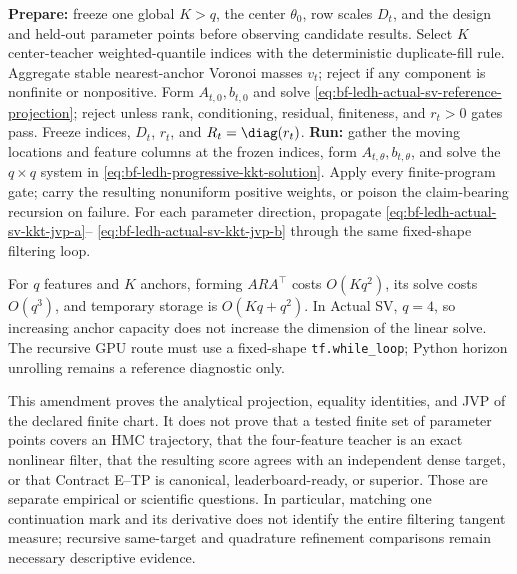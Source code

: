 \begin{algorithm}[H]
\caption{Actual-SV overcomplete analytical chart preparation and runtime}
\label{alg:bf-ledh-actual-sv-overcomplete-chart}
\begin{algorithmic}[1]
  \State \textbf{Prepare:} freeze one global \(K>q\), the center
    \(\theta_0\), row scales \(D_t\), and the design and held-out parameter
    points before observing candidate results.
    \State Select \(K\) center-teacher weighted-quantile indices with the
      deterministic duplicate-fill rule.
    \State Aggregate stable nearest-anchor Voronoi masses \(v_t\); reject if
      any component is nonfinite or nonpositive.
    \State Form \(A_{t,0},b_{t,0}\) and solve
      \eqref{eq:bf-ledh-actual-sv-reference-projection}; reject unless rank,
      conditioning, residual, finiteness, and \(r_t>0\) gates pass.
    \State Freeze indices, \(D_t\), \(r_t\), and \(R_t=\diag(r_t)\).
  \EndFor
  \State \textbf{Run:} gather the moving locations and feature columns at the
    frozen indices, form \(A_{t,\theta},b_{t,\theta}\), and solve the
    \(q\times q\) system in
    \eqref{eq:bf-ledh-progressive-kkt-solution}.
  \State Apply every finite-program gate; carry the resulting nonuniform
    positive weights, or poison the claim-bearing recursion on failure.
  \State For each parameter direction, propagate
    \eqref{eq:bf-ledh-actual-sv-kkt-jvp-a}--
    \eqref{eq:bf-ledh-actual-sv-kkt-jvp-b} through the same fixed-shape
    filtering loop.
\end{algorithmic}
\end{algorithm}

For \(q\) features and \(K\) anchors, forming \(ARA^\top\) costs
\(O(Kq^2)\), its solve costs \(O(q^3)\), and temporary storage is
\(O(Kq+q^2)\).  In Actual SV, \(q=4\), so increasing anchor capacity does not
increase the dimension of the linear solve.  The recursive GPU route must use
a fixed-shape \texttt{tf.while\_loop}; Python horizon unrolling remains a
reference diagnostic only.

This amendment proves the analytical projection, equality identities, and JVP
of the declared finite chart.  It does not prove that a tested finite set of
parameter points covers an HMC trajectory, that the four-feature teacher is an
exact nonlinear filter, that the resulting score agrees with an independent
dense target, or that Contract E--TP is canonical, leaderboard-ready, or
superior.  Those are separate empirical or scientific questions.  In
particular, matching one continuation mark and its derivative does not identify
the entire filtering tangent measure; recursive same-target and quadrature
refinement comparisons remain necessary descriptive evidence.

